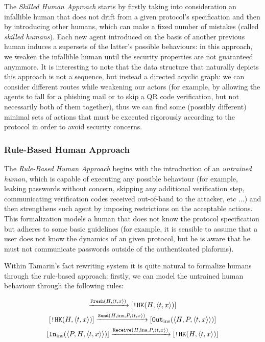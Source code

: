 \documentclass{article}
\newcommand{\mono}[1]{\textrm{\tt #1}}
\begin{document}
The \textit{Skilled Human Approach} starts by firstly taking into consideration an infallible human that does not drift from a given protocol's specification and then by introducing other humans, which can make a fixed number of mistakes (called \textit{skilled humans}). Each new agent introduced on the basis of another previous human induces a supersets of the latter's possible behaviours: in this approach, we weaken the infallible human until the security properties are not guaranteed anymmore. It is interesting to note that the data structure that naturally depicts this approach is not a sequence, but instead a directed acyclic graph: we can consider different routes while weakening our actors (for example, by allowing the agents to fall for a phishing mail or to skip a QR code verification, but not necessarily both of them together), thus we can find some (possibly different) minimal sets of actions that must be executed rigorously according to the protocol in order to avoid security concerns.

\subsubsection{Rule-Based Human Approach}

The \textit{Rule-Based Human Approach} begins with the introduction of an \textit{untrained human}, which is capable of executing any possible behaviour (for example, leaking passwords without concern, skipping any additional verification step, communicating verification codes received out-of-band to the attacker, etc ...) and then strengthens such agent by imposing restrictions on the acceptable actions. This formalization models a human that does not know the protocol specification but adheres to some basic guidelines (for example, it is sensible to assume that a user does not know the dynamics of an given protocol, but he is aware that he must not communicate passwords outside of the authenticated plaforms).

Within Tamarin's fact rewriting system it is quite natural to formalize humans through the rule-based approach: firstly, we can model the untrained human behaviour through the following rules:

\begin{gather}
    [\mono{Fr}(x)] \xrightarrow{\mono{Fresh}(H, \langle t,x \rangle)} [\mono{!HK}(H, \langle t,x \rangle)] \label{eq:fresh_term_knowledge}\\
    [\mono{!HK}(H, \langle t, x \rangle)] \xrightarrow{\mono{Send}(H, \textrm{ins}, P, \langle t,x \rangle)} [\mono{Out}_{\textrm{ins}}(\langle H, P, \langle t,x \rangle \rangle)] \label{eq:telling_the_attacker}\\
    [\mono{In}_{\textrm{ins}}(\langle P, H, \langle t,x \rangle \rangle)] \xrightarrow{\mono{Receive}(H, \textrm{ins}, P, \langle t,x \rangle)} [\mono{!HK}(H, \langle t,x \rangle)] \label{eq:retrieving_from_the_attacker}
\end{gather}
\end{document}
